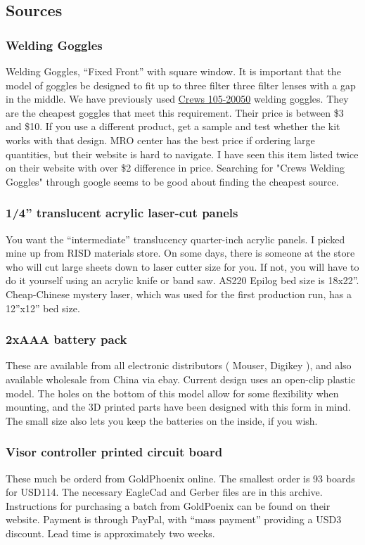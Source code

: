 \documentclass[11pt]{scrartcl}
\begin{document}
\subsection{Sources}
\subsubsection{Welding Goggles}
Welding Goggles, ``Fixed Front'' with square window. It is important that the model of goggles be designed to fit up to three filter three filter lenses with a gap in the middle. We have previously used  \href{http://www.shoplet.com/Crews-Welding-Goggles-20050/SEPTLS13520050/spdv}{Crews 105-20050} welding goggles. They are the cheapest goggles that meet this requirement. Their price is between \$3 and \$10.   If you use a different product, get a sample and test whether the kit works with that design. MRO center has the best price if ordering large quantities, but their website is hard to navigate. I have seen this item listed twice on their website with over \$2 difference in price. Searching for "Crews Welding Goggles" through google seems to be good about finding the cheapest source.
\subsubsection{1/4'' translucent acrylic laser-cut panels}
You want the ``intermediate'' translucency quarter-inch acrylic panels. I picked mine up from RISD materials store. On some days, there is someone at the store who will cut large sheets down to laser cutter size for you. 
If not, you will have to do it yourself using an acrylic knife or band saw. AS220 Epilog bed size is 18x22''. Cheap-Chinese mystery laser, which was used for the first production run, has a 12''x12'' bed size.
\subsubsection{2xAAA battery pack}
These are available from all electronic distributors ( Mouser, Digikey ), and also available wholesale from China via ebay. Current design uses an open-clip plastic model. The holes on the bottom of this model allow for some flexibility when mounting, and the 3D printed parts have been designed with this form in mind. The small size also lets you keep the batteries on the inside, if you wish.
\subsubsection{Visor controller printed circuit board}
These much be orderd from GoldPhoenix online. The smallest order is 93 boards for USD114. The necessary EagleCad and Gerber files are in this archive. Instructions for purchasing a batch from GoldPoenix can be found on their website. Payment is through PayPal, with ``mass payment'' providing a USD3 discount. Lead time is approximately two weeks.
\end{document}
